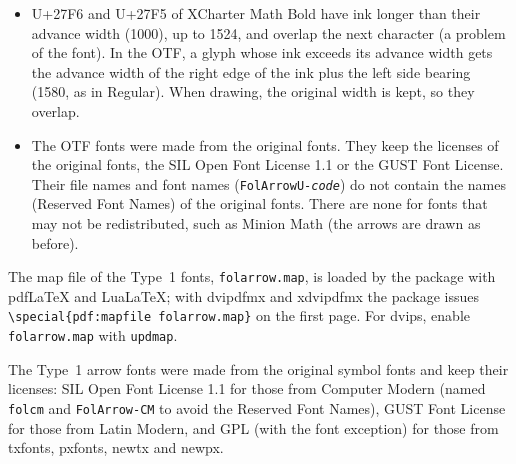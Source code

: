 \documentclass[dvipdfmx,a4paper]{article}
\newcommand\pkg[1]{\textsf{#1}}
\newcommand\file[1]{\texttt{#1}}
\begin{document}
\begin{itemize}
  before rotation and is aligned to the math axis. The affected fonts are determined from their
  extensible pieces and listed in \file{folarrow-otf.def}. The broken vertical arrows where
  \pkg{folarrow} commands are not used (usual \verb|@VVV| and \verb|@AAA| of \pkg{amscd},
  \verb|\Big\downarrow|, etc.)\ are a problem of the font and are not supported.
\item U+27F6 and U+27F5 of XCharter Math Bold have ink longer than their advance width (1000),
  up to 1524, and overlap the next character (a problem of the font). In the OTF, a glyph whose
  ink exceeds its advance width gets the advance width of the right edge of the ink plus the left
  side bearing (1580, as in Regular). When drawing, the original width is kept, so they overlap.
\item The OTF fonts were made from the original fonts. They keep the licenses of the original
  fonts, the SIL Open Font License 1.1 or the GUST Font License. Their file names and font names
  (\texttt{FolArrowU-\textit{code}}) do not contain the names (Reserved Font Names) of the
  original fonts. There are none for fonts that may not be redistributed, such as Minion Math
  (the arrows are drawn as before).
\end{itemize}

The map file of the Type~1 fonts, \file{folarrow.map}, is loaded by the package with
pdf\LaTeX{} and Lua\LaTeX; with dvipdfmx and xdvipdfmx the package issues
\verb|\special{pdf:mapfile folarrow.map}| on the first page.
For dvips, enable \file{folarrow.map} with \file{updmap}.

The Type~1 arrow fonts were made from the original symbol fonts and keep their licenses:
SIL Open Font License 1.1 for those from Computer Modern (named \file{folcm} and
\texttt{FolArrow-CM} to avoid the Reserved Font Names), GUST Font License for those from
Latin Modern, and GPL (with the font exception) for those from \pkg{txfonts}, \pkg{pxfonts},
\pkg{newtx} and \pkg{newpx}.
\end{document}
